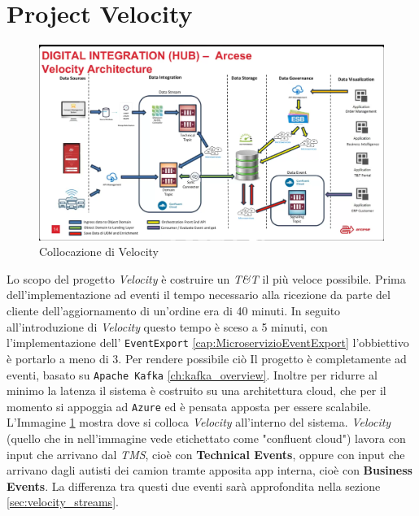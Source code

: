 \section{Project Velocity}
\label{sec:project_velocity}
\begin{figure}[htbp]
    \centering
    \includegraphics[width=\textwidth]{images/architecture/collocazione_velocity.png}
    \caption{Collocazione di Velocity}
    \label{fig:collocazione_velocity_img}
\end{figure}
Lo scopo del progetto \textit{Velocity} è costruire un \textit{T\&T} il più veloce possibile.
Prima dell'implementazione ad eventi il tempo necessario alla ricezione da parte del cliente dell'aggiornamento di un'ordine era di 40 minuti.
In seguito all'introduzione di \textit{Velocity} questo tempo è sceso a 5 minuti, con l'implementazione dell' \texttt{EventExport} \ref{cap:MicroservizioEventExport} l'obbiettivo è portarlo a meno di 3.
Per rendere possibile ciò Il progetto è completamente ad eventi, basato su \texttt{Apache Kafka} \ref{ch:kafka_overview}. 
Inoltre per ridurre al minimo la latenza il sistema è costruito su una architettura cloud, che per il momento si appoggia ad \texttt{Azure} ed è pensata apposta per essere scalabile.
L'Immagine \ref{fig:collocazione_velocity_img} mostra dove si colloca \textit{Velocity} all'interno del sistema.
\textit{Velocity} (quello che in nell'immagine vede etichettato come "confluent cloud") lavora con input che arrivano dal \textit{TMS}, cioè con \textbf{Technical Events},
oppure con input che arrivano dagli autisti dei camion tramte apposita app interna, cioè con \textbf{Business Events}.
La differenza tra questi due eventi sarà approfondita nella sezione \ref{sec:velocity_streams}.


